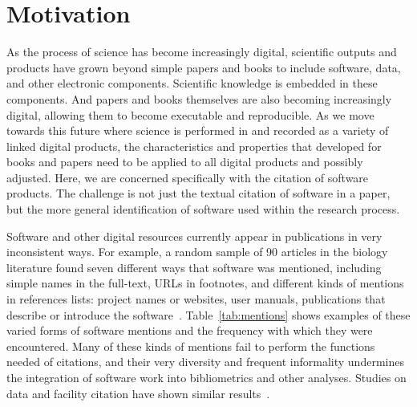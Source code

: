 \documentclass[11pt, oneside]{amsart}
\begin{document}
\section{Motivation}
\label{sec:intro}

As the process of science has become increasingly digital, scientific outputs and products have
grown beyond simple papers and books to include software, data, and other electronic
components.  Scientific knowledge is embedded in these components.  And papers and books
themselves are also becoming increasingly digital, allowing them to become executable
and reproducible.  As we move towards this future where science is performed in and recorded
as a variety of linked digital products, the characteristics and properties that developed for
books and papers need to be applied to all digital products and possibly adjusted.  Here, we are concerned specifically
with the citation of software products.  The challenge is not just the textual citation of software in a paper, but the more general identification of software used within the research process.

Software and other digital resources currently appear in publications in very inconsistent ways.
For example, a random sample of 90 articles in the biology literature
found seven different ways that software was mentioned, including simple
names in the full-text, URLs in footnotes, and different kinds of mentions
in references lists: project names or websites, user manuals, publications
that describe or introduce the software~\cite{howison2015jasist}.
Table~\ref{tab:mentions} shows examples of these varied forms of software
mentions and the frequency with which they were encountered.
Many of these kinds of mentions fail to perform the functions needed of citations, and their very diversity and frequent informality undermines the integration of software work into bibliometrics and other analyses.
Studies on data and facility citation have shown similar results~\cite{10.1371/journal.pone.0136631, mayernik_poster, parsons_duerr_minster}.
\end{document}
